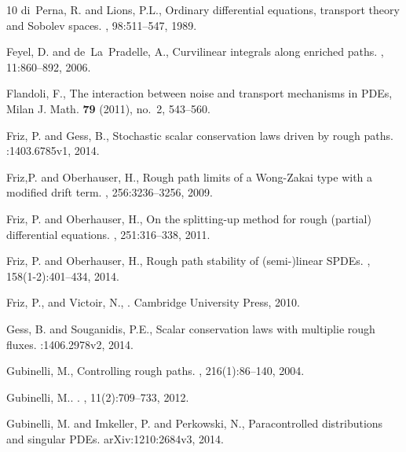 \documentclass[11pt,a4paper]{amsart}
\numberwithin{equation}{section} %
\begin{document}
\begin{thebibliography}{10}
di~Perna, R. and Lions, P.L.,
\newblock Ordinary differential equations, transport theory and {S}obolev spaces.
, 98:511--547, 1989.


Feyel, D. and de~La~Pradelle, A.,
\newblock Curvilinear integrals along enriched paths.
, 11:860--892, 2006.

 Flandoli, F.,
  \newblock The interaction between noise and transport mechanisms in PDEs, 
  \newblock Milan J. Math. {\bf 79} (2011), no.~2, 543--560. 

Friz, P. and Gess, B.,
\newblock Stochastic scalar conservation laws driven by rough paths.
:1403.6785v1, 2014.

Friz,P. and Oberhauser, H.,
\newblock Rough path limits of a {W}ong-{Z}akai type with a modified drift term.
, 256:3236--3256, 2009. 
 

Friz, P. and Oberhauser, H.,
\newblock On the splitting-up method for rough (partial) differential equations.
, 251:316--338, 2011.

Friz, P. and Oberhauser, H.,
\newblock Rough path stability of (semi-)linear SPDEs.
, 158(1-2):401--434, 2014.



 Friz, P.,  and  Victoir, N.,
.
\newblock Cambridge University Press, 2010.


Gess, B. and Souganidis, P.E.,
\newblock Scalar conservation laws with multiplie rough fluxes.
:1406.2978v2, 2014.

Gubinelli, M.,
\newblock Controlling rough paths.
, 216(1):86--140, 2004.


Gubinelli, M..
.
, 11(2):709--733, 2012.

Gubinelli, M. and Imkeller, P. and Perkowski, N.,
\newblock Paracontrolled distributions and singular {PDE}s.
\newblock arXiv:1210:2684v3, 2014.


\end{thebibliography}
\end{document}
